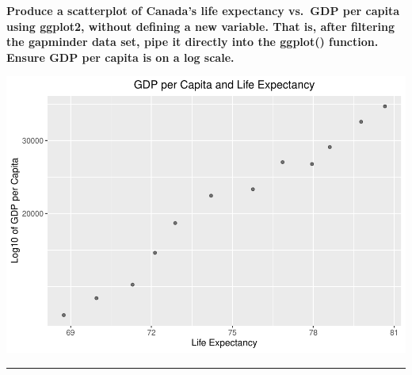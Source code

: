 \documentclass[]{article}
\newenvironment{Shaded}{\begin{snugshade}}{\end{snugshade}}
\newcommand{\DataTypeTok}[1]{\textcolor[rgb]{0.13,0.29,0.53}{#1}}
\newcommand{\FloatTok}[1]{\textcolor[rgb]{0.00,0.00,0.81}{#1}}
\newcommand{\KeywordTok}[1]{\textcolor[rgb]{0.13,0.29,0.53}{\textbf{#1}}}
\newcommand{\NormalTok}[1]{#1}
\newcommand{\OperatorTok}[1]{\textcolor[rgb]{0.81,0.36,0.00}{\textbf{#1}}}
\newcommand{\StringTok}[1]{\textcolor[rgb]{0.31,0.60,0.02}{#1}}
\begin{document}
\textbf{Produce a scatterplot of Canada's life expectancy vs.~GDP per
capita using ggplot2, without defining a new variable. That is, after
filtering the gapminder data set, pipe it directly into the ggplot()
function. Ensure GDP per capita is on a log scale.}

\begin{Shaded}
\end{Shaded}

\includegraphics{hw02_files/figure-latex/Exercise 1.5-1.pdf}

\begin{center}\rule{0.5\linewidth}{\linethickness}\end{center}
\end{document}
